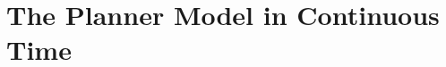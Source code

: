 \part{The Planner Model in Continuous Time}\label{part:sp}





\begin{appendices}

\end{appendices}
